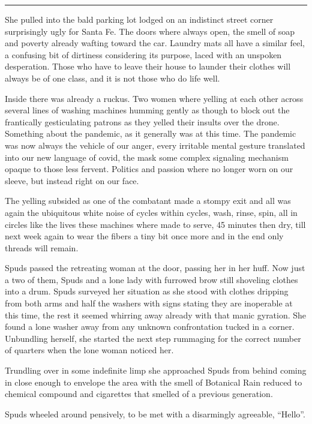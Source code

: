 \documentclass[ebook, 10pt, openright, onecolumn]{memoir}
\newcommand*\starbreak{\fancybreak*{\Large{* * *}}}
\begin{document}
\starbreak{}


She pulled into the bald parking lot lodged on an indistinct street corner
surprisingly ugly for Santa Fe. The doors where always open, the smell of soap
and poverty already wafting toward the car.  Laundry mats all have a similar
feel, a confusing bit of dirtiness considering its purpose, laced with an
unspoken desperation.  Those who have to leave their house to launder their
clothes will always be of one class, and it is not those who do life well.

Inside there was already a ruckus. Two women where yelling at each other across
several lines of washing machines humming gently as though to block out the
frantically gesticulating patrons as they yelled their insults over the drone.
Something about the pandemic, as it generally was at this time.  The pandemic
was now always the vehicle of our anger, every irritable mental gesture
translated into our new language of covid, the mask some complex signaling
mechanism opaque to those less fervent.  Politics and passion where no longer
worn on our sleeve, but instead right on our face.

The yelling subsided as one of the combatant made a stompy exit and all was
again the ubiquitous white noise of cycles within cycles, wash, rinse, spin, all
in circles like the lives these machines where made to serve, 45 minutes then
dry, till next week again to wear the fibers a tiny bit once more and in the end
only threads will remain.

Spuds passed the retreating woman at the door, passing her in her huff.  Now
just a two of them, Spuds and a lone lady with furrowed brow still shoveling
clothes into a drum.  Spuds surveyed her situation as she stood with clothes
dripping from both arms and half the washers with signs stating they are
inoperable at this time, the rest it seemed whirring away already with that
manic gyration. She found a lone washer away from any unknown confrontation
tucked in a corner.  Unbundling herself, she started the next step rummaging for
the correct number of quarters when the lone woman noticed her.

Trundling over in some indefinite limp she approached Spuds from behind coming
in close enough to envelope the area with the smell of Botanical Rain reduced to
chemical compound and cigarettes that smelled of a previous generation.

Spuds wheeled around pensively, to be met with a disarmingly agreeable,
``Hello''.
\end{document}
